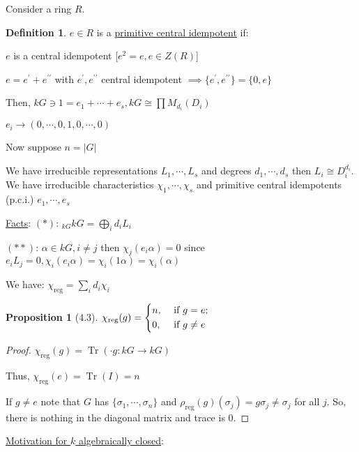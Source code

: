 \documentclass{article}
\theoremstyle{definition}
\newtheorem*{definition}{Definition}
\newtheorem{proposition}[theorem]{Proposition}
\newcommand{\Tr}{\operatorname{Tr}}
\begin{document}
Consider a ring \(R\).

\begin{definition}
    \(e\in R\) is a \underline{primitive central idempotent} if:
    
    \(e\) is a central idempotent [\(e^2 = e, e\in Z(R)\)]

    \(e = e^{\prime} + e^{\prime\prime}\) with \(e^{\prime} , e^{\prime\prime} \) central idempotent \(\implies \{ e^{\prime} , e^{\prime\prime}  \} = \{ 0, e \} \) 
\end{definition}

Then, \(kG\ni 1 = e_1 + \cdots + e_s, kG \cong \prod M_{d_i}(D_i)\)

\(e_i \to (0, \cdots , 0, 1, 0, \cdots , 0)\) 

Now suppose \(n = \vert G \vert \) 

We have irreducible representations \(L_1, \cdots , L_s\) and degrees \(d_1, \cdots , d_s\) then \(L_i \cong D_i^{d_i}\). We have irreducible characteristics \(\chi _1, \cdots , \chi _s\) and primitive central idempotents (p.c.i.) \(e_1, \cdots , e_s\) 

\underline{Facts}: \((\ast)\): \(_{kG} kG = \bigoplus_{i} d_i L_i\) 

\((\ast\ast)\): \(\alpha \in kG, i \neq j\) then \(\chi_j(e_i \alpha) = 0\) since \(e_i L_j = 0, \chi_i (e_i \alpha) =\chi_i (1 \alpha) = \chi_i (\alpha )\)  

We have: \(\chi_{\text{reg}} = \sum_{i} d_i \chi_i\) 

\begin{proposition}
    [4.3] \(\chi_{\text{reg}}(g) = \begin{dcases}
        n, &\text{ if } g=e ;\\
        0, &\text{ if } g \neq e
    \end{dcases}\) 
\end{proposition}

\begin{proof}
    \(\chi_{\text{reg}}(g) = \Tr (\cdot g: kG \to kG)\)
    
    Thus, \(\chi_{\text{reg}}(e) = \Tr(I) = n\)
    
    If \(g \neq e\) note that \(G\) has \(\{ \sigma_1, \cdots , \sigma_n \} \) and \(\rho_{\text{reg}}(g) (\sigma_j) = g \sigma_j \neq \sigma_j\) for all \(j\). So, there is nothing in the diagonal matrix and trace is \(0\).
\end{proof}

\underline{Motivation for \(k\) algebraically closed}:
\end{document}
